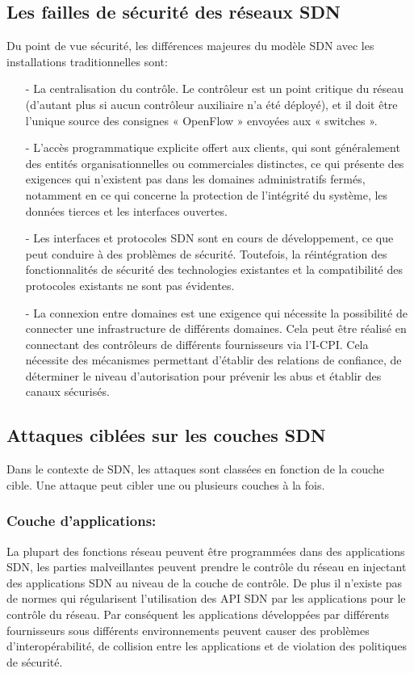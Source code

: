 \subsection{Les failles de sécurité des réseaux SDN}
Du point de vue sécurité, les différences majeures du modèle SDN avec les installations traditionnelles sont: \\
\begin{itemize}
\item[-]La centralisation du contrôle. Le contrôleur est un point critique du réseau (d’autant plus si aucun contrôleur auxiliaire n’a été déployé), et il doit être l’unique source des consignes « OpenFlow » envoyées aux « switches ».\\
\item[-]L’accès programmatique explicite offert aux clients, qui sont généralement des entités organisationnelles  ou commerciales distinctes, ce qui présente des exigences qui n’existent pas dans les domaines administratifs fermés, notamment en ce qui concerne la protection de l’intégrité du système, les données tierces et les interfaces ouvertes.\\
\item[-]Les interfaces et protocoles SDN sont en cours de développement, ce que peut conduire à des problèmes de sécurité. Toutefois, la réintégration des fonctionnalités de sécurité des technologies existantes et la compatibilité des protocoles existants ne sont pas évidentes.\\
\item[-]La connexion entre domaines est une exigence qui nécessite la possibilité de connecter une infrastructure de différents domaines. Cela peut être réalisé en connectant des contrôleurs de différents fournisseurs via l’I-CPI. Cela nécessite des mécanismes permettant d’établir des relations de confiance, de déterminer le niveau d’autorisation pour prévenir les abus et établir des canaux sécurisés.
\end{itemize}

\newpage
\subsection{Attaques ciblées sur les couches SDN}
\label{cibles}
Dans le contexte de SDN, les attaques sont classées en fonction de la couche cible. Une attaque peut cibler une ou plusieurs couches à la fois.
\subsubsection{Couche d'applications:} 
La plupart des fonctions réseau peuvent être programmées dans des applications SDN, les parties malveillantes peuvent prendre le contrôle du réseau en injectant des applications SDN au niveau de la couche de contrôle. De plus il n’existe pas de normes qui régularisent l’utilisation des API SDN par les applications pour le contrôle du réseau. Par conséquent les applications développées par différents fournisseurs sous différents environnements peuvent causer des problèmes d’interopérabilité, de collision entre les applications et de violation des politiques de sécurité.  

